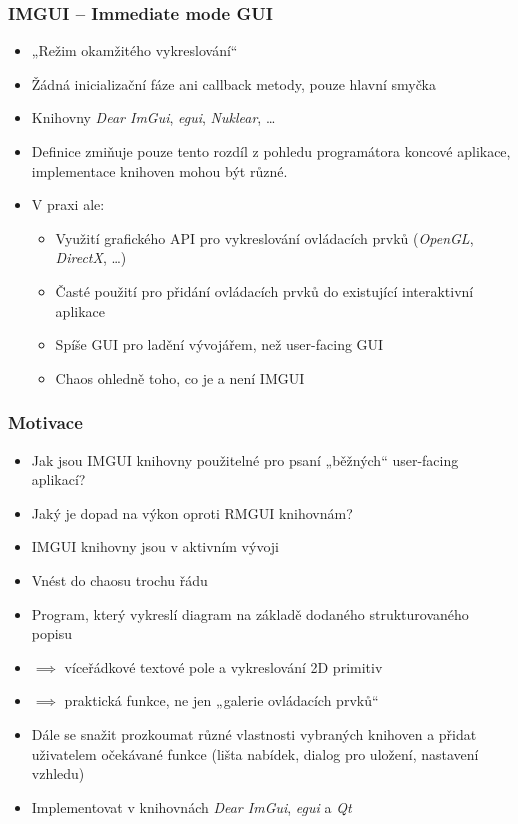 \documentclass[FM,widescreen]{tulpresentation} %
\begin{document}
	\begin{frame}[plain]\frametitle{IMGUI – Immediate mode GUI}
		\begin{itemize}
			\item „Režim okamžitého vykreslování“
			\item Žádná inicializační fáze ani callback metody, pouze hlavní smyčka			
			\item Knihovny \textit{Dear ImGui}, \textit{egui}, \textit{Nuklear}, \dots
		\end{itemize}
		
		\begin{itemize}
			\item Definice zmiňuje pouze tento rozdíl z pohledu programátora koncové aplikace, implementace knihoven mohou být různé.
			\item V praxi ale:
			\begin{itemize}
				\item Využití grafického API pro vykreslování ovládacích prvků (\textit{OpenGL}, \textit{DirectX}, \dots)
				\item Časté použití pro přidání ovládacích prvků do existující interaktivní aplikace
				\item Spíše GUI pro ladění vývojářem, než user-facing GUI
				\item Chaos ohledně toho, co je a není IMGUI
			\end{itemize}
		\end{itemize}
	\end{frame}
	
	\begin{frame}[plain]\frametitle{Motivace}
		\begin{itemize}
			\item Jak jsou IMGUI knihovny použitelné pro psaní „běžných“ user-facing aplikací?
			\item Jaký je dopad na výkon oproti RMGUI knihovnám?
			\item IMGUI knihovny jsou v aktivním vývoji
			\item Vnést do chaosu trochu řádu
		\end{itemize}		
		\begin{itemize}
			\item Program, který vykreslí diagram na základě dodaného strukturovaného popisu
			\item $\implies$ víceřádkové textové pole a vykreslování 2D primitiv
			\item $\implies$ praktická funkce, ne jen „galerie ovládacích prvků“
			\item Dále se snažit prozkoumat různé vlastnosti vybraných knihoven a přidat uživatelem očekávané funkce (lišta nabídek, dialog pro uložení, nastavení vzhledu)
			\item Implementovat v knihovnách \textit{Dear ImGui}, \textit{egui} a \textit{Qt}
		\end{itemize}
	\end{frame}
	
\end{document}
